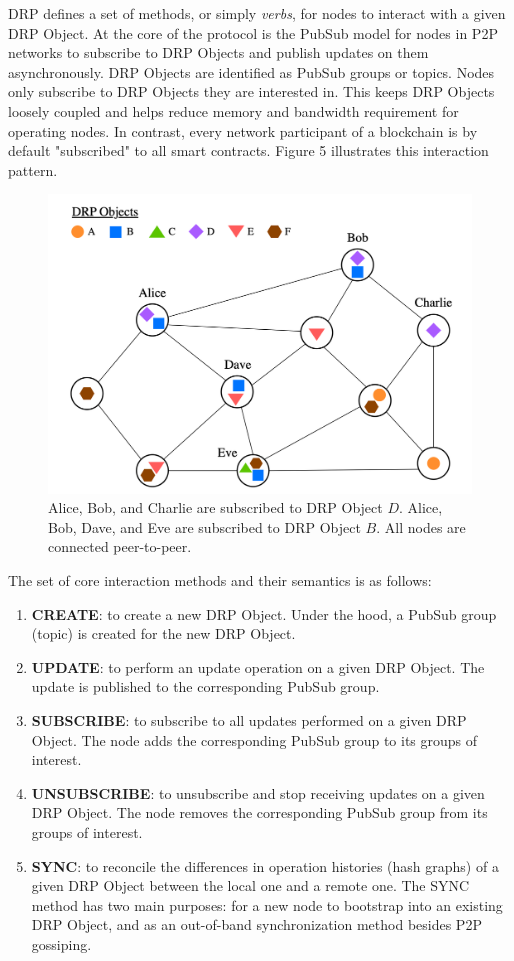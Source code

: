 \documentclass{article}
\begin{document}
DRP defines a set of methods, or simply \textit{verbs}, for nodes to interact with a given DRP Object. At the core of the protocol is the PubSub model for nodes in P2P networks to subscribe to DRP Objects and publish updates on them asynchronously. DRP Objects are identified as PubSub groups or topics. Nodes only subscribe to DRP Objects they are interested in. This keeps DRP Objects loosely coupled and helps reduce memory and bandwidth requirement for operating nodes. In contrast, every network participant of a blockchain is by default "subscribed" to all smart contracts. Figure 5 illustrates this interaction pattern.

\begin{figure}[htp]
    \centering
    \includegraphics[width=13cm]{fig5}
    \caption{Alice, Bob, and Charlie are subscribed to DRP Object $D$. Alice, Bob, Dave, and Eve are subscribed to DRP Object $B$. All nodes are connected peer-to-peer.}
    \label{fig:5}
\end{figure}

The set of core interaction methods and their semantics is as follows:
\begin{enumerate}
    \item \textbf{CREATE}: to create a new DRP Object. Under the hood, a PubSub group (topic) is created for the new DRP Object.
    \item \textbf{UPDATE}: to perform an update operation on a given DRP Object. The update is published to the corresponding PubSub group.
    \item \textbf{SUBSCRIBE}: to subscribe to all updates performed on a given DRP Object. The node adds the corresponding PubSub group to its groups of interest.
    \item \textbf{UNSUBSCRIBE}: to unsubscribe and stop receiving updates on a given DRP Object. The node removes the corresponding PubSub group from its groups of interest.
    \item \textbf{SYNC}: to reconcile the differences in operation histories (hash graphs) of a given DRP Object between the local one and a remote one. The SYNC method has two main purposes: for a new node to bootstrap into an existing DRP Object, and as an out-of-band synchronization method besides P2P gossiping.
\end{enumerate}
\end{document}
